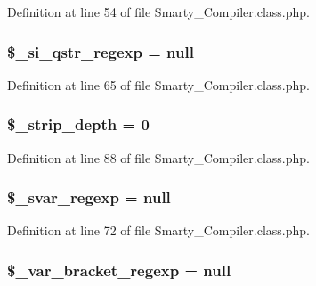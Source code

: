 \-Definition at line 54 of file \-Smarty\-\_\-\-Compiler.\-class.\-php.

\hypertarget{class_smarty___compiler_ae0f5ad8fa4f39bf3841b4050118639e4}{
\subsubsection[{\$\-\_\-si\-\_\-qstr\-\_\-regexp}]{\setlength{\rightskip}{0pt plus 5cm}\$\-\_\-si\-\_\-qstr\-\_\-regexp = null}}\label{class_smarty___compiler_ae0f5ad8fa4f39bf3841b4050118639e4}


\-Definition at line 65 of file \-Smarty\-\_\-\-Compiler.\-class.\-php.

\hypertarget{class_smarty___compiler_a006aa851ee309c157bd3fb7eccebfcb0}{
\subsubsection[{\$\-\_\-strip\-\_\-depth}]{\setlength{\rightskip}{0pt plus 5cm}\$\-\_\-strip\-\_\-depth = 0}}\label{class_smarty___compiler_a006aa851ee309c157bd3fb7eccebfcb0}


\-Definition at line 88 of file \-Smarty\-\_\-\-Compiler.\-class.\-php.

\hypertarget{class_smarty___compiler_a292414f7f09bb3ebeac27f334bf284a5}{
\subsubsection[{\$\-\_\-svar\-\_\-regexp}]{\setlength{\rightskip}{0pt plus 5cm}\$\-\_\-svar\-\_\-regexp = null}}\label{class_smarty___compiler_a292414f7f09bb3ebeac27f334bf284a5}


\-Definition at line 72 of file \-Smarty\-\_\-\-Compiler.\-class.\-php.

\hypertarget{class_smarty___compiler_ad7ef814a6d41972d34c9ea972e2555e7}{
\subsubsection[{\$\-\_\-var\-\_\-bracket\-\_\-regexp}]{\setlength{\rightskip}{0pt plus 5cm}\$\-\_\-var\-\_\-bracket\-\_\-regexp = null}}\label{class_smarty___compiler_ad7ef814a6d41972d34c9ea972e2555e7}


